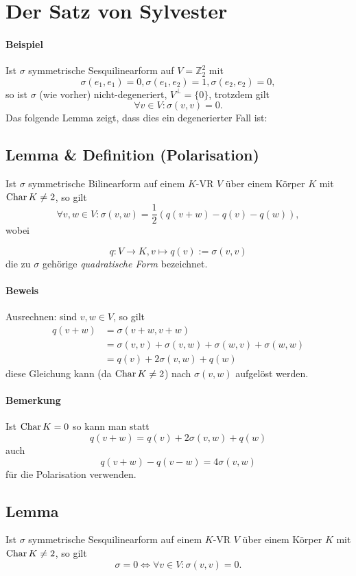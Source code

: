 \section{Der Satz von Sylvester}
\paragraph{Beispiel}
	Ist $ \sigma $ symmetrische Sesquilinearform auf $ V=\mathbb{Z}^2_2 $ mit
		\[ \sigma(e_1,e_1)=0, \sigma(e_1,e_2) = 1, \sigma(e_2,e_2) = 0, \]
	so ist $ \sigma $ (wie vorher) nicht-degeneriert, $ V^\perp =\{0\}$, trotzdem gilt
		\[ \forall v\in V: \sigma(v,v) = 0. \]
	Das folgende Lemma zeigt, dass dies ein degenerierter Fall ist:
	
\subsection{Lemma \& Definition (Polarisation)}
\begin{Lemma}[Polarisationslemma]	
	Ist $ \sigma $ symmetrische Bilinearform auf einem $ K $-VR $ V $ über einem Körper $ K $ mit $ \operatorname{Char} K \neq 2 $, so gilt
		\[ \forall v,w\in V: \sigma(v,w)=\frac{1}{2}\left(q(v+w)-q(v)-q(w)\right), \]
	wobei
\end{Lemma}
\begin{Definition}
		\[ q:V\to K, v\mapsto q(v):= \sigma(v,v) \]
	die zu $ \sigma $ gehörige \emph{quadratische Form} bezeichnet.
\end{Definition}
\paragraph{Beweis}
	Ausrechnen: sind $ v,w\in V $, so gilt
	\begin{align*}
	q(v+w) &= \sigma(v+w,v+w)\\
			&= \sigma(v,v) + \sigma(v,w)+\sigma(w,v)+\sigma(w,w)\\
			&= q(v)+2\sigma(v,w)+q(w)
	\end{align*}
	diese Gleichung kann (da $ \operatorname{Char} K\neq 2 $) nach $ \sigma(v,w) $ aufgelöst werden.
\paragraph{Bemerkung}
	Ist $ \operatorname{Char} K=0 $ so kann man statt
		\[ q(v+w)=q(v)+2\sigma(v,w)+q(w) \]
	auch
		\[ q(v+w)-q(v-w) = 4 \sigma(v,w) \]
	für die Polarisation verwenden.
	
\subsection{Lemma}
\begin{Lemma}[]
	Ist $ \sigma $ symmetrische Sesquilinearform auf einem $ K $-VR $ V $ über einem Körper $ K $ mit $ \operatorname{Char} K \neq 2 $, so gilt
		\[ \sigma = 0 \Leftrightarrow \forall v\in V: \sigma(v,v) = 0. \]
\end{Lemma}

